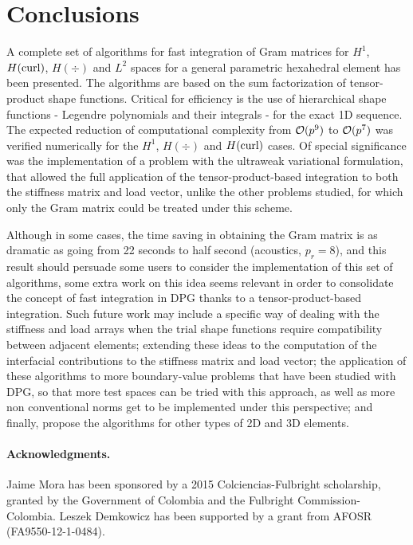 \section{Conclusions}

A complete set of algorithms for fast integration of Gram matrices for $H^1$, $H(\operatorname{curl})$, $H(\div)$ and $L^2$ spaces for a general parametric hexahedral element has been presented. The algorithms are based on the sum factorization of tensor-product shape functions. Critical for efficiency is the use of hierarchical shape functions - Legendre polynomials and their integrals - for the exact 1D sequence. The expected reduction of computational complexity from $\mathcal{O}(p^9)$ to $\mathcal{O}(p^7)$ was verified numerically for the $H^1$, $H(\div)$ and $H(\operatorname{curl})$ cases. Of special significance was the implementation of a problem with the ultraweak variational formulation, that allowed the full application of the tensor-product-based integration to both the stiffness matrix and load vector, unlike the other problems studied, for which only the Gram matrix could be treated under this scheme.

Although in some cases, the time saving in obtaining the Gram matrix is as dramatic as going from 22 seconds to half second (acoustics, $p_r=8$), and this result should persuade some users to consider the implementation of this set of algorithms, some extra work on this idea seems relevant in order to consolidate the concept of fast integration in DPG thanks to a tensor-product-based integration. Such future work may include a specific way of dealing with the stiffness and load arrays when the trial shape functions require compatibility between adjacent elements; extending these ideas to the computation of the interfacial contributions to the stiffness matrix and load vector; the application of these algorithms to more boundary-value problems that have been studied with DPG, so that more test spaces can be tried with this approach, as well as more non conventional norms get to be implemented under this perspective; and finally, propose the algorithms for other types of 2D and 3D elements.

\paragraph{Acknowledgments.}
Jaime Mora has been sponsored by a 2015 Colciencias-Fulbright scholarship, granted by the Government of Colombia and the Fulbright Commission-Colombia. Leszek Demkowicz has been supported by a grant from AFOSR (FA9550-12-1-0484).